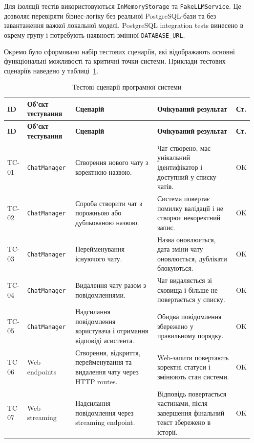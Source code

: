 Для ізоляції тестів використовуються \texttt{InMemoryStorage} та \texttt{FakeLLMService}. Це дозволяє перевіряти бізнес-логіку без реальної PostgreSQL-бази та без завантаження важкої локальної моделі. PostgreSQL integration tests винесено в окрему групу і потребують наявності змінної \texttt{DATABASE\_URL}.

Окремо було сформовано набір тестових сценаріїв, які відображають основні функціональні можливості та критичні точки системи. Приклади тестових сценаріїв наведено у таблиці~\ref{tab:test-cases}.

\small
\begin{longtable}{|p{1.2cm}|p{2.7cm}|p{4.2cm}|p{3.9cm}|p{1.3cm}|}
\caption{Тестові сценарії програмної системи}
\label{tab:test-cases}\\
\hline
\textbf{ID} & \textbf{Об'єкт тестування} & \textbf{Сценарій} & \textbf{Очікуваний результат} & \textbf{Ст.} \\
\hline
\endfirsthead
\hline
\textbf{ID} & \textbf{Об'єкт тестування} & \textbf{Сценарій} & \textbf{Очікуваний результат} & \textbf{Ст.} \\
\hline
\endhead
TC-01 & \texttt{ChatManager} & Створення нового чату з коректною назвою. & Чат створено, має унікальний ідентифікатор і доступний у списку чатів. & OK \\
\hline
TC-02 & \texttt{ChatManager} & Спроба створити чат з порожньою або дубльованою назвою. & Система повертає помилку валідації і не створює некоректний запис. & OK \\
\hline
TC-03 & \texttt{ChatManager} & Перейменування існуючого чату. & Назва оновлюється, дата зміни чату оновлюється, дублікати блокуються. & OK \\
\hline
TC-04 & \texttt{ChatManager} & Видалення чату разом з повідомленнями. & Чат видаляється зі сховища і більше не повертається у списку. & OK \\
\hline
TC-05 & \texttt{ChatManager} & Надсилання повідомлення користувача і отримання відповіді асистента. & Обидва повідомлення збережено у правильному порядку. & OK \\
\hline
TC-06 & Web endpoints & Створення, відкриття, перейменування та видалення чату через HTTP routes. & Web-запити повертають коректні статуси і змінюють стан системи. & OK \\
\hline
TC-07 & Web streaming & Надсилання повідомлення через streaming endpoint. & Відповідь повертається частинами, після завершення фінальний текст збережено в історії. & OK \\
\hline

\end{longtable}
